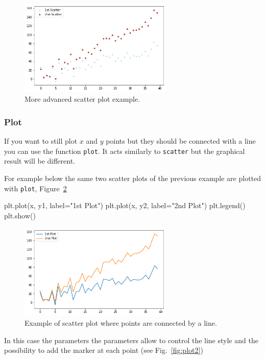 \begin{ipython}
\begin{figure}[htb]
	\centering
	\includegraphics[width=0.65\textwidth]{figures/scatter2}
	\caption{More advanced scatter plot example.}
	\label{fig:scatter2}
\end{figure}

\subsubsection{Plot}\label{plot}

If you want to still plot \(x\) and \(y\) points but they should be
connected with a line you can use the function \texttt{plot}. It acts
similarly to \texttt{scatter} but the graphical result will be
different.

For example below the same two scatter plots of the previous example are
plotted with \texttt{plot}, Figure~\ref{fig:plot1}

\begin{ipython}
plt.plot(x, y1, label="1st Plot")
plt.plot(x, y2, label="2nd Plot")
plt.legend()
plt.show()
\end{ipython}

\begin{figure}[htb]
	\centering
	\includegraphics[width=0.65\textwidth]{figures/plot1}
	\caption{Example of scatter plot where points are connected by a line.}
	\label{fig:plot1}
\end{figure}

In this case the parameters the parameters allow to control the line
style and the possibility to add the marker at each point (see Fig.~\ref{fig:plot2})


\end{ipython}
